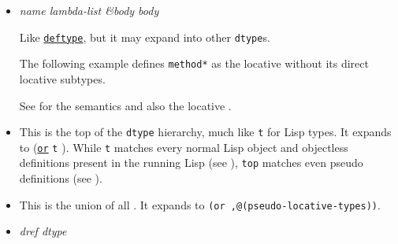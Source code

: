 \begin{itemize}
\item
  \label{x-28DREF-3ADEFINE-DTYPE-20MGL-PAX-3AMACRO-29}
  \emph{name lambda-list \&body body}

  Like
  \href{http://www.lispworks.com/documentation/HyperSpec/Body/m_deftp.htm}{\texttt{deftype}},
  but it may expand into other \texttt{dtype}s.

  The following example defines \texttt{method*} as the locative
   without
  its direct locative subtypes.

\begin{Shaded}
\begin{Highlighting}[]
 \NormalTok{ (}
\end{Highlighting}
\end{Shaded}

  See  for the
  semantics and also the locative
  .
\item
  \label{x-28DREF-3ATOP-20DREF-3ADTYPE-29}

  This is the top of the \texttt{dtype} hierarchy, much like \texttt{t}
  for Lisp types. It expands to
  (\href{http://www.lispworks.com/documentation/HyperSpec/Body/t_or.htm}{\texttt{or}}
  \texttt{t}
  ). While
  \texttt{t} matches every normal Lisp object and objectless definitions
  present in the running Lisp (see
  ),
  \texttt{top} matches even pseudo definitions (see
  ).
\item
  \label{x-28DREF-3APSEUDO-20DREF-3ADTYPE-29}

  This is the union of all
  .
  It expands to \texttt{(or\ ,@(pseudo-locative-types))}.
\item
  \label{x-28DREF-3ADTYPEP-20FUNCTION-29}
  \emph{dref dtype}


\end{itemize}
